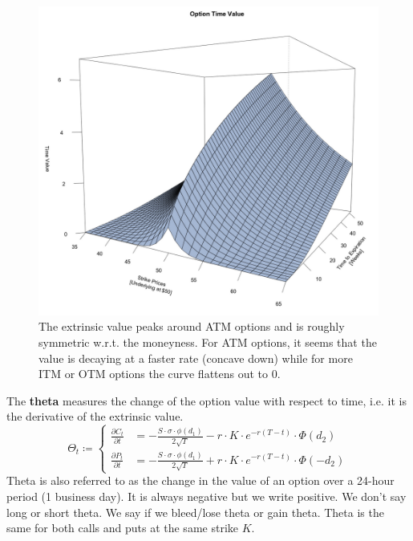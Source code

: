 \documentclass{article}
\begin{document}
    \begin{figure}[H]
      \centering 
      \includegraphics[scale=0.4]{img/theta2.png}
      \caption{The extrinsic value peaks around ATM options and is roughly symmetric w.r.t. the moneyness. For ATM options, it seems that the value is decaying at a faster rate (concave down) while for more ITM or OTM options the curve flattens out to $0$. } 
      \label{fig:theta2}
    \end{figure}

    \begin{definition}[Theta]
      The \textbf{theta} measures the change of the option value with respect to time, i.e. it is the derivative of the extrinsic value. 
      \begin{equation}
        \Theta_t \coloneqq \begin{cases} 
          \frac{\partial C_t}{\partial t} & =  -\frac{S \cdot \sigma \cdot \phi(d_1)}{2 \sqrt{T}} - r \cdot K \cdot e^{-r(T - t)} \cdot \Phi(d_2) \\ 
          \frac{\partial P_t}{\partial t} & = -\frac{S \cdot \sigma \cdot \phi(d_1)}{2 \sqrt{T}} + r \cdot K \cdot e^{-r(T - t)} \cdot \Phi(-d_2)
        \end{cases}
      \end{equation}
      Theta is also referred to as the change in the value of an option over a 24-hour period (1 business day). It is always negative but we write positive. We don't say long or short theta. We say if we bleed/lose theta or gain theta. Theta is the same for both calls and puts at the same strike $K$.
    \end{definition}
\end{document}
